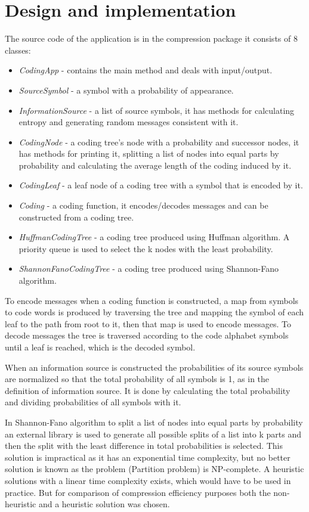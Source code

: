 \documentclass{article}
\begin{document}
\section{Design and implementation}
The source code of the application is in the compression package it consists of 8 classes:
\begin{itemize}
	\item \textit{CodingApp} - contains the main method and deals with input/output.
	\item \textit{SourceSymbol} - a symbol with a probability of appearance.
	\item \textit{InformationSource} - a list of source symbols, it has methods for calculating entropy and generating random messages consistent with it.
	\item \textit{CodingNode} - a coding tree's node with a probability and successor nodes, it has methods for printing it, splitting a list of nodes into equal parts by probability and calculating the average length of the coding induced by it.
	\item \textit{CodingLeaf} - a leaf node of a coding tree with a symbol that is encoded by it.
	\item \textit{Coding} - a coding function, it encodes/decodes messages and can be constructed from a coding tree.
	\item \textit{HuffmanCodingTree} - a coding tree produced using Huffman algorithm. A priority queue is used to select the k nodes with the least probability.
	\item \textit{ShannonFanoCodingTree} - a coding tree produced using Shannon-Fano algorithm.
\end{itemize}
To encode messages when a coding function is constructed, a map from symbols to code words is produced by traversing the tree and mapping the symbol of each leaf to the path from root to it, then that map is used to encode messages. To decode messages the tree is traversed according to the code alphabet symbols until a leaf is reached, which is the decoded symbol.

When an information source is constructed the probabilities of its source symbols are normalized so that the total probability of all symbols is 1, as in the definition of information source. It is done by calculating the total probability and dividing probabilities of all symbols with it.

In Shannon-Fano algorithm to split a list of nodes into equal parts by probability an external library is used to generate all possible splits of a list into k parts and then the split with the least difference in total probabilities is selected. This solution is impractical as it has an exponential time complexity, but no better solution is known as the problem (Partition problem) is NP-complete. A heuristic solutions with a linear time complexity exists, which would have to be used in practice. But for comparison of compression efficiency purposes both the non-heuristic and a heuristic solution was chosen.
\end{document}
